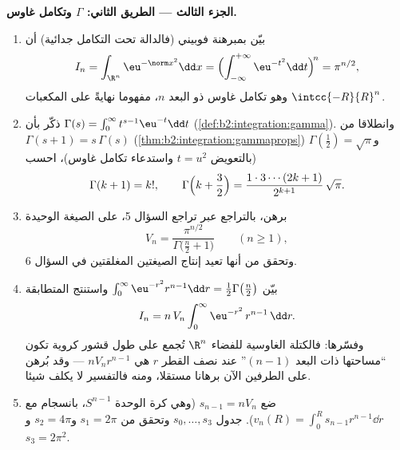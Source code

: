 \begin{problem}[{مسألة نهاية الأسبوع --- $V_n =
\pi^{n/2}/\Gamma(\frac n2 + 1)$، وغرابة الأبعاد
العليا}]
\medskip
\noindent\textbf{الجزء الثالث --- الطريق الثاني: $\Gamma$ وتكامل
غاوس.}
\begin{enumerate}[resume]
  \item بيّن بمبرهنة فوبيني (فالدالة تحت التكامل جدائية) أن
        \[
        I_n = \int_{\R^n}\eu^{-\norm
        x^2}\dd x
        = \Bigl(\int_{-\infty}^{+\infty}
        \eu^{-t^2}\dd t\Bigr)^{\!n} = \pi^{n/2},
        \]
        وهو تكامل غاوس ذو البعد $n$، مفهوما نهايةً على المكعبات
        $\intcc{-R}{R}^n$.
  \item ذكّر بأن $\Gamma(s) = \int_0^\infty t^{s-1}\eu^{-t}\dd
        t$ (\cref{def:b2:integration:gamma}). وانطلاقا من $\Gamma(s+1) = s\,\Gamma(s)$ (\cref{thm:b2:integration:gammaprops})
        و$\Gamma(\tfrac12) = \sqrt\pi$ (بالتعويض $t = u^2$ واستدعاء تكامل غاوس)، احسب
        \[
        \Gamma(k + 1) = k!,
        \qquad
        \Gamma\Bigl(k + \frac32\Bigr) =
        \frac{1\cdot3\cdots(2k+1)}{2^{k+1}}\,\sqrt\pi .
        \]
  \item برهن، بالتراجع عبر تراجع السؤال 5، على الصيغة الوحيدة
        \[
        V_n = \frac{\pi^{n/2}}{\Gamma\bigl(\frac n2 +
        1\bigr)} \qquad (n \geq 1),
        \]
        وتحقق من أنها تعيد إنتاج الصيغتين المغلقتين في السؤال 6.
  \item بيّن $\int_0^\infty \eu^{-r^2}r^{n-1}\dd r =
        \tfrac12\Gamma\bigl(\tfrac n2\bigr)$ واستنتج المتطابقة
        \[
        I_n = n\,V_n\int_0^\infty \eu^{-r^2}\,r^{n-1}\,\dd r.
        \]
        وفسّرها: فالكتلة الغاوسية للفضاء $\R^n$ تُجمع على طول قشور
        كروية تكون ``مساحتها ذات البعد $(n-1)$'' عند نصف القطر
        $r$ هي $nV_nr^{n-1}$ --- وقد بُرهن على الطرفين الآن برهانا
        مستقلا، ومنه فالتفسير لا يكلف شيئا.
  \item ضع $s_{n-1} = nV_n$ (وهي  كرة الوحدة $S^{n-1}$، بانسجام مع $v_n(R) = \int_0^R
        s_{n-1}r^{n-1}\dd r$).
        جدول $s_0, \dots, s_3$ وتحقق من $s_1 = 2\pi$ و$s_2 = 4\pi$ و$s_3 = 2\pi^2$.
\end{enumerate}


\end{problem}
